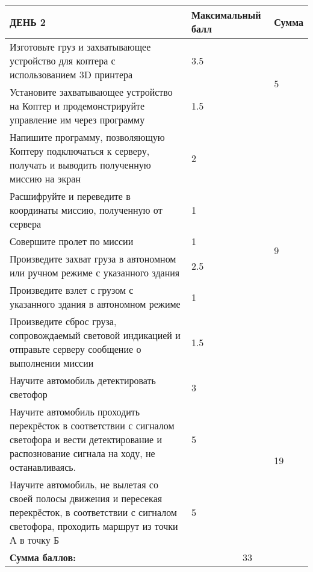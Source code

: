 \begin{longtable}{|p{8.5cm}|p{3.5cm}|p{1.5cm}|}           
    \hline
    ДЕНЬ 2 & Максимальный балл & Сумма \\ 
    \hline
    Изготовьте груз и захватывающее устройство для коптера с использованием 3D принтера & 3.5 & \multirow{2}{*}{5} \\ 
    \cline{1-2}
    Установите захватывающее устройство на Коптер и продемонстрируйте управление им через программу & 1.5 & \\ 
    \hline
    Напишите программу, позволяющую Коптеру подключаться к серверу, получать и выводить полученную миссию на экран & 2 & \multirow{6}{*}{9} \\ 
    \cline{1-2}
    Расшифруйте и переведите в координаты миссию, полученную от сервера & 1 & \\ 
    \cline{1-2}
    Совершите пролет по миссии & 1 & \\ 
    \cline{1-2}
    Произведите захват груза в автономном или ручном режиме с указанного здания & 2.5 & \\ 
    \cline{1-2}
    Произведите взлет с грузом с указанного здания в автономном режиме & 1 & \\ 
    \cline{1-2}
    Произведите сброс груза, сопровождаемый световой индикацией и отправьте серверу сообщение о выполнении миссии & 1.5 & \\ 
    \hline
    Научите автомобиль детектировать светофор & 3 & \multirow{3}{*}{19} \\ 
    \cline{1-2}
    Научите автомобиль проходить перекрёсток в соответствии с сигналом светофора и вести детектирование и распознование сигнала на ходу, не останавливаясь. & 5 & \\ 
    \cline{1-2}
    Научите автомобиль, не вылетая со своей полосы движения и пересекая перекрёсток, в соответствии с сигналом светофора, проходить маршрут из точки А в точку Б & 5 & \\ 
    \hline
    \textbf{Сумма баллов:} & \multicolumn{2}{|c|}{33} \\
    \hline
\end{longtable}


